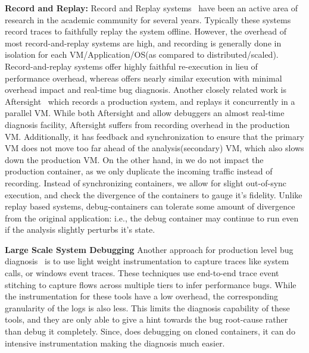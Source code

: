 \noindent
\textbf{Record and Replay:}  
Record and Replay systems~\cite{odr,revirt,guo2008r2, geels2007friday, laadan2010transparent} have been an active area of research in the academic community for several years. 
Typically these systems record traces to faithfully replay the system offline.
However, the overhead of most record-and-replay systems are high, and recording is generally done in isolation for each VM/Application/OS(as compared to distributed/scaled).  
Record-and-replay systems offer highly faithful re-execution in lieu of performance overhead, whereas \parikshan offers nearly similar execution with minimal overhead impact and real-time bug diagnosis.
Another closely related work is Aftersight~\cite{aftersight} which records a production system, and replays it concurrently in a parallel VM.
While both Aftersight and \parikshan allow debuggers an almost real-time diagnosis facility, Aftersight suffers from recording overhead in the production VM.
Additionally, it has feedback and synchronization to ensure that the primary VM does not move too far ahead of the analysis(secondary) VM, which also slows down the production VM.
On the other hand, in \parikshan we do not impact the production container, as we only duplicate the incoming traffic instead of recording.
Instead of synchronizing containers, we allow for slight out-of-sync execution, and check the divergence of the containers to gauge it's fidelity.
Unlike replay based systems, \parikshan debug-containers can tolerate some amount of divergence from the original application: i.e., the debug container may continue to run even if the analysis slightly perturbs it's state.
  
\noindent
\textbf{Large Scale System Debugging}
Another approach for production level bug diagnosis~\cite{magpie,clue,vpath} is to use light weight instrumentation to capture traces like system calls, or windows event traces.
These techniques use end-to-end trace event stitching to capture flows across multiple tiers to infer performance bugs.
While the instrumentation for these tools have a low overhead, the corresponding granularity of the logs is also less.
This limits the diagnosis capability of these tools, and they are only able to give a hint towards the bug root-cause rather than debug it completely.
Since, \parikshan does debugging on cloned containers, it can do intensive instrumentation making the diagnosis much easier.


